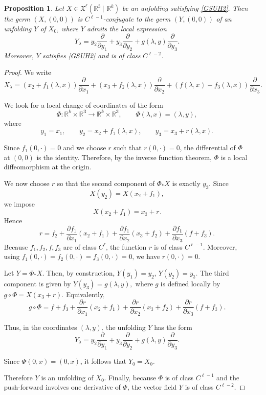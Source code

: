 \documentclass[12pt]{article}
\newtheorem{proposition}{Proposition}[section]
\newtheorem{remark definition}{Remark Definition}[section]
\begin{document}
\begin{proposition}
	Let $X\in \mathfrak{X}^{\ell}(\mathbb{R}^3\mid \mathbb{R}^k)$
	be an unfolding satisfying \eqref{GSUH2}. Then the germ
	$(X,(0,0))$ is $C^{\ell-1}$-conjugate to the germ $(Y,(0,0))$ of an
	unfolding $Y$ of $X_0$, where $Y$ admits the local expression
	$$
	Y_\lambda
	=
	y_2\frac{\partial}{\partial y_1}
	+
	y_3\frac{\partial}{\partial y_2}
	+
	g(\lambda,y)\frac{\partial}{\partial y_3}.
	$$
	Moreover, $Y$ satisfies \eqref{GSUH2} and is of class $C^{\ell-2}$.
\end{proposition}

\begin{proof}
	We write
	$$
	X_\lambda
	=
	(x_2+f_1(\lambda,x))\frac{\partial}{\partial x_1}
	+
	(x_3+f_2(\lambda,x))\frac{\partial}{\partial x_2}
	+
	(f(\lambda,x)+f_3(\lambda,x))\frac{\partial}{\partial x_3}.
	$$
	
	We look for a local change of coordinates of the form
	$$
	\Phi:\mathbb{R}^k\times \mathbb{R}^3
	\longrightarrow
	\mathbb{R}^k\times \mathbb{R}^3,
	\qquad
	\Phi(\lambda,x)=(\lambda,y),
	$$
	where
	$$
	y_1=x_1,\qquad
	y_2=x_2+f_1(\lambda,x),\qquad
	y_3=x_3+r(\lambda,x).
	$$
	
	Since $f_1(0,\cdot)=0$ and we choose $r$ such that $r(0,\cdot)=0$, the
	differential of $\Phi$ at $(0,0)$ is the identity. Therefore, by the inverse
	function theorem, $\Phi$ is a local diffeomorphism at the origin.
	
	We now choose $r$ so that the second component of $\Phi_*X$ is exactly
	$y_3$. Since
	$$
	X(y_2)
	=
	X(x_2+f_1),
	$$
	we impose
	$$
	X(x_2+f_1)=x_3+r.
	$$
	Hence
	$$
	r
	=
	f_2
	+
	\frac{\partial f_1}{\partial x_1}(x_2+f_1)
	+
	\frac{\partial f_1}{\partial x_2}(x_3+f_2)
	+
	\frac{\partial f_1}{\partial x_3}(f+f_3).
	$$
	Because $f_1,f_2,f,f_3$ are of class $C^\ell$, the function $r$ is of class
	$C^{\ell-1}$. Moreover, using $f_1(0,\cdot)=f_2(0,\cdot)=f_3(0,\cdot)=0$,
	we have $r(0,\cdot)=0.$
	
	Let $Y=\Phi_*X.$ 	Then, by construction,	$Y(y_1)=y_2$, 	$Y(y_2)=y_3.$
	The third component is given by $Y(y_3)=g(\lambda,y),$ 	where $g$ is defined locally by $g\circ \Phi	=X(x_3+r).$
	Equivalently,
	$$
	g\circ \Phi
	=
	f+f_3
	+
	\frac{\partial r}{\partial x_1}(x_2+f_1)
	+
	\frac{\partial r}{\partial x_2}(x_3+f_2)
	+
	\frac{\partial r}{\partial x_3}(f+f_3).
	$$
	
	Thus, in the coordinates $(\lambda,y)$, the unfolding $Y$ has the form
	$$
	Y_\lambda
	=
	y_2\frac{\partial}{\partial y_1}
	+
	y_3\frac{\partial}{\partial y_2}
	+
	g(\lambda,y)\frac{\partial}{\partial y_3}.
	$$
	
	Since $\Phi(0,x)=(0,x)$, it follows that $Y_0=X_0.$
	
	Therefore $Y$ is an unfolding of $X_0$. Finally, because $\Phi$ is of class
	$C^{\ell-1}$ and the push-forward involves one derivative of $\Phi$, the
	vector field $Y$ is of class $C^{\ell-2}$.
\end{proof}
\end{document}
